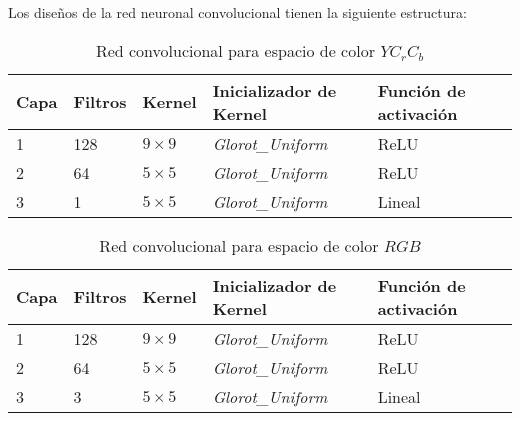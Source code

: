 \begin{comment}
Para el caso del espacio de color $YC_rC_b$ realizamos el entrenamiento únicamente en el
canal $Y$, ya que es en este canal en donde se concentra la mayor parte de la información de la imagen referente a los detalles y
texturas (Si vemos este canal por separado, sería como ver la imagen en escala de grises). Para el caso del espacio de color $RGB$
el entrenamiento fue realizado sobre los 3 canales, ya que en este espacio de color, los detalles y texturas de la imagen se
distribuyen entre los 3 canales.\\
\end{comment}

Los diseños de la red neuronal convolucional tienen la siguiente estructura:
\begin{table}[H]
    \centering
    \caption{Red convolucional para espacio de color $YC_rC_b$}
    \begin{tabular}{|l|l|l|l|l|}
    \hline
    \textbf{Capa} & \textbf{Filtros} & \textbf{Kernel}  & \textbf{Inicializador de Kernel} & \textbf{Función de activación}\\ \hline
    1             & 128              & $9\times9$       & \emph{Glorot\_Uniform}           & ReLU                 \\
    2             & 64               & $5\times5$       & \emph{Glorot\_Uniform}           & ReLU                 \\
    3             & 1                & $5\times5$       & \emph{Glorot\_Uniform}           & Lineal               \\ \hline
    \end{tabular}
\end{table}

\begin{table}[H]
    \centering
    \caption{Red convolucional para espacio de color $RGB$}
    \begin{tabular}{|l|l|l|l|l|}
    \hline
    \textbf{Capa} & \textbf{Filtros} & \textbf{Kernel}  & \textbf{Inicializador de Kernel} & \textbf{Función de activación}\\ \hline
    1             & 128              & $9\times9$       & \emph{Glorot\_Uniform}           & ReLU                 \\
    2             & 64               & $5\times5$       & \emph{Glorot\_Uniform}           & ReLU                 \\
    3             & 3                & $5\times5$       & \emph{Glorot\_Uniform}           & Lineal               \\ \hline
    \end{tabular}
\end{table}

